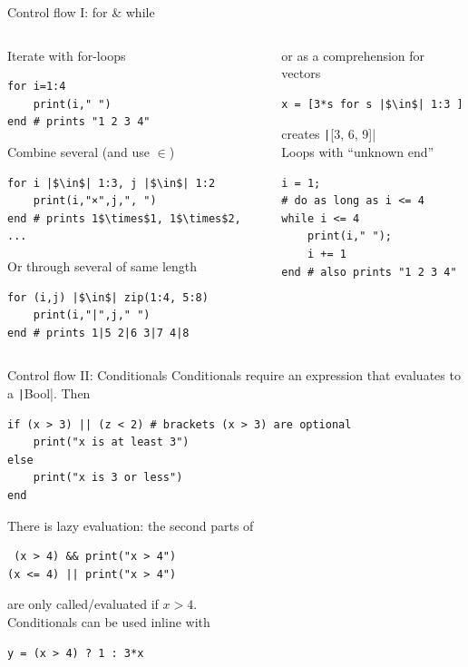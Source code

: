 \documentclass[aspectratio=169, 11pt, handout]{beamer}
\begin{document}
    \begin{frame}[fragile]{Control flow I: for \& while}
        \begin{columns}[T]
            \begin{column}{.5\textwidth}
                \alert{Iterate} with for-loops
                \begin{verbatim}
for i=1:4
    print(i," ")
end # prints "1 2 3 4"
                \end{verbatim}
                \pause
                Combine several (and use $\in$)
                \begin{verbatim}
for i |$\in$| 1:3, j |$\in$| 1:2
    print(i,"×",j,", ")
end # prints 1$\times$1, 1$\times$2, ...
                \end{verbatim}
                \pause
                Or through several of same length
                \begin{verbatim}
for (i,j) |$\in$| zip(1:4, 5:8)
    print(i,"|",j," ")
end # prints 1|5 2|6 3|7 4|8
                \end{verbatim}
            \end{column}
            \pause
            \begin{column}{.5\textwidth}
                or as a \alert{comprehension} for vectors
                \begin{verbatim}
x = [3*s for s |$\in$| 1:3 ]
                \end{verbatim}
                creates \texttt|[3, 6, 9]|
                \\[2.5\baselineskip]
                Loops with “unknown end”
                \begin{verbatim}
i = 1;
# do as long as i <= 4
while i <= 4
    print(i," ");
    i += 1
end # also prints "1 2 3 4"
                \end{verbatim}
            \end{column}
        \end{columns}
    \end{frame}
    \begin{frame}[fragile]{Control flow II: Conditionals}
        \alert{Conditionals} require an expression that evaluates to a \texttt|Bool|. Then
        \begin{verbatim}
if (x > 3) || (z < 2) # brackets (x > 3) are optional
    print("x is at least 3")
else
    print("x is 3 or less")
end
        \end{verbatim}
        \pause
        There is \alert{lazy evaluation}: the second parts of
        \begin{verbatim}
 (x > 4) && print("x > 4")
(x <= 4) || print("x > 4")
        \end{verbatim}
        are only called/evaluated if $x > 4$.
        \\[\baselineskip]
        \pause
        Conditionals can be used inline with
        \begin{verbatim}
y = (x > 4) ? 1 : 3*x
        \end{verbatim}
    \end{frame}
\end{document}
